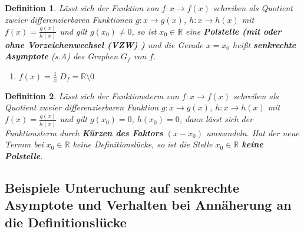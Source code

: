 \documentclass{book}
\newtheorem{definition}{Definition}
\begin{document}
\begin{definition}

    Lässt sich der Funktion von $f:x \to f(x) $ schreiben als Quotient zweier differenzierbaren Funktionen $g:x \to g(x)$, $h:x\to h(x) $ mit $f(x) = \frac {g(x)}{h(x)}$ und gilt $g(x_0) \not = 0$, so ist $x_0 \in \mathbb{R}$ eine \textbf{Polstelle (mit oder ohne Vorzeichenwechsel (VZW) )} und die Gerade $x = x_0$ heißt \textbf{senkrechte Asymptote} (s.A) des Graphen $G_f$ von $f$.
    
\end{definition}

\begin{enumerate}
    \item $f(x) = \frac 1x \; D_f = \mathbb{R} \setminus {0}$
        \[
        \]
\end{enumerate}

\begin{definition}
    
    Lässt sich der Funktionsterm von $f:x \to f(x)$ schreiben als Quotient zweier differenzierbaren Funktion $g:x \to g(x)$, $h:x \to h(x)$ mit $f(x) = \frac{g(x)}{h(x)}$ und gilt $g(x_0) = 0$, $h(x_0) = 0$, dann lässt sich der Funktionsterm durch \textbf{Kürzen des Faktors} $(x-x_0)$ umwandeln. Hat der neue Termm bei $x_0 \in \mathbb{R}$ keine Definitionslücke, so ist die Stelle $x_0 \in \mathbb{R}$ \textbf{keine Polstelle}.
    
\end{definition}

\subsection{Beispiele Unteruchung auf senkrechte Asymptote und Verhalten bei Annäherung an die Definitionslücke}
\end{document}
